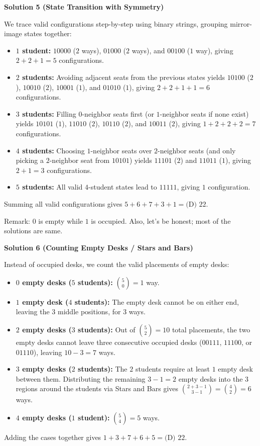 \begin{enumerate}
\textbf{Solution 5 (State Transition with Symmetry)}

We trace valid configurations step-by-step using binary strings, grouping mirror-image states together:

 
            \begin{itemize}
        \item \textbf{$1$ student:} $10000$ ($2$ ways), $01000$ ($2$ ways), and $00100$ ($1$ way), giving $2 + 2 + 1 = 5$ configurations.
        \item \textbf{$2$ students:} Avoiding adjacent seats from the previous states yields $10100$ ($2$), $10010$ ($2$), $10001$ ($1$), and $01010$ ($1$), giving $2 + 2 + 1 + 1 = 6$ configurations.
        \item \textbf{$3$ students:} Filling $0$-neighbor seats first (or $1$-neighbor seats if none exist) yields $10101$ ($1$), $11010$ ($2$), $10110$ ($2$), and $10011$ ($2$), giving $1 + 2 + 2 + 2 = 7$ configurations.
        \item \textbf{$4$ students:} Choosing $1$-neighbor seats over $2$-neighbor seats (and only picking a $2$-neighbor seat from $10101$) yields $11101$ ($2$) and $11011$ ($1$), giving $2 + 1 = 3$ configurations.
        \item \textbf{$5$ students:} All valid $4$-student states lead to $11111$, giving $1$ configuration.
            \end{itemize}
            Summing all valid configurations gives $5 + 6 + 7 + 3 + 1 = \boxed{\text{(D) }{22}}$.

 Remark: $0$ is empty while $1$ is occupied. Also, let's be honest; most of the solutions are same.

 



\textbf{Solution 6 (Counting Empty Desks / Stars and Bars)}

Instead of occupied desks, we count the valid placements of empty desks:

 
            \begin{itemize}
        \item \textbf{$0$ empty desks ($5$ students):} $\binom{5}{0} = 1$ way.
        \item \textbf{$1$ empty desk ($4$ students):} The empty desk cannot be on either end, leaving the $3$ middle positions, for $3$ ways.
        \item \textbf{$2$ empty desks ($3$ students):} Out of $\binom{5}{2} = 10$ total placements, the two empty desks cannot leave three consecutive occupied desks ($00111$, $11100$, or $01110$), leaving $10 - 3 = 7$ ways.
        \item \textbf{$3$ empty desks ($2$ students):} The $2$ students require at least $1$ empty desk between them. Distributing the remaining $3 - 1 = 2$ empty desks into the $3$ regions around the students via Stars and Bars gives $\binom{2 + 3 - 1}{3 - 1} = \binom{4}{2} = 6$ ways.
        \item \textbf{$4$ empty desks ($1$ student):} $\binom{5}{4} = 5$ ways.
            \end{itemize}
            Adding the cases together gives $1 + 3 + 7 + 6 + 5 = \boxed{\text{(D) }{22}}$.


\end{enumerate}

